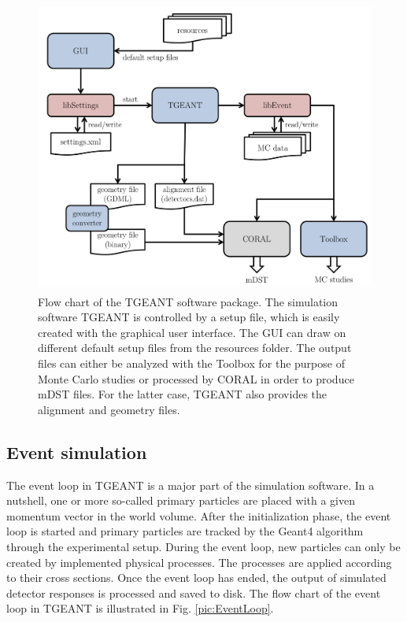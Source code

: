 \begin{figure}[!h]
  \centering
	\includegraphics[scale=0.5]{./gfx/TGEANTflowchart.png}
	\caption{Flow chart of the TGEANT software package. The simulation software TGEANT is controlled by a setup file, which is easily created with the graphical user interface. The GUI can draw on different default setup files from the resources folder. The output files can either be analyzed with the Toolbox for the purpose of Monte Carlo studies or processed by CORAL in order to produce mDST files. For the latter case, TGEANT also provides the alignment and geometry files.}
	\label{pic:TGEANTflowchart}
\end{figure}

\subsection{Event simulation}

The event loop in TGEANT is a major part of the simulation software. In a nutshell, one or more so-called primary particles are placed with a given momentum vector in the world volume. After the initialization phase, the event loop is started and primary particles are tracked by the Geant4 algorithm through the experimental setup. During the event loop, new particles can only be created by implemented physical processes. The processes are applied according to their cross sections. Once the event loop has ended, the output of simulated detector responses is processed and saved to disk. The flow chart of the event loop in TGEANT is illustrated in Fig. \ref{pic:EventLoop}.

